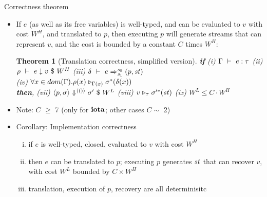 \documentclass{beamer}
\newtheorem{thm}{Theorem}
\newtheorem{cor}[thm]{Corollary}
\begin{document}
\begin{frame}[shrink=20]{Correctness theorem}
\begin{itemize}
	\item If $e$ (as well as its free variables) is well-typed, and can be evaluated to $v$ with cost $W^H$, and translated to $p$,
	then executing $p$ will generate streams that can represent $v$, and the cost is bounded by a constant $C$ times $W^H$: 
	
\begin{thm}[Translation correctness, simplified version]
	\small 
	\textbf{if}
    (i) $\Gamma \ \vdash\  e : \tau$ \quad (ii) $\rho \ \vdash\  e \downarrow v \ \$ \ W^H$ \quad
	(iii) $\delta \ \vdash\  e \Rightarrow^{\mathit{s}_0}_{\mathit{s}_1} (p,\mathit{st})$ \\ 
	(iv) $\forall x \in dom(\Gamma). \rho(x) \mathrel{\triangleright_{\Gamma(x)}} \sigma^*(\delta(x))$ \\
	\textbf{then},
	(vii) $\left\langle p,\sigma \right\rangle \Downarrow^{\langle () \rangle} \sigma' \ \$ \ W^L$ \quad
    (viii)  $v \mathrel{\triangleright_{\tau}} \sigma'^*(\mathit{st})$ \quad
	(ix) $W^L \le C \cdot W^H$  \\
	\end{thm}
	\item Note: $C$ $\ge$ 7 (only for $\mathbf{iota}$; other cases $C \sim$ 2) 

	

\pause
\item Corollary: Implementation correctness
  \begin{enumerate}[(i)]
	\item if $e$ is well-typed, closed, evaluated to $v$ with cost $W^H$
	\item then $e$ can be translated to $p$; executing $p$ generates $\mathit{st}$ that can recover $v$, with cost $W^L$ bounded by $C \times W^H$ 
	\item translation, execution of $p$, recovery are all determinisitc
\end{enumerate}

\end{itemize}
\end{frame}
\end{document}
